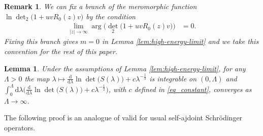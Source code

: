 \documentclass{article}
\def\d{\mathrm{d}}
\newtheorem{Remark}[Theorem]{Remark}
\newtheorem{Lemma}[Theorem]{Lemma}
\begin{document}
\begin{Remark}\label{rmk:branch}
We can fix a branch of the meromorphic function $\ln \det_2\big(1+uvR_0(z)v\big)$ by the condition
\begin{align*}
\lim_{|z| \to \infty} \arg\Big({\det}_2\big(1+uvR_0(z)v\big) \Big)&= 0.
\end{align*}
Fixing this branch gives $m = 0$ in Lemma \ref{lem:high-energy-limit} and we take this convention for the rest of this paper.
\end{Remark}

\begin{Lemma}\label{lem:integrable}
Under the assumptions of Lemma \ref{lem:high-energy-limit}, for any $\Lambda > 0$ the map $\lambda \mapsto \frac{\d}{\d \lambda} \ln\det\big(S(\lambda)\big) + c \lambda^{-\frac12}$ is integrable on $(0,\Lambda)$ and $\int_0^\Lambda \d\lambda \big(\frac{\d}{\d \lambda} \ln\det\big(S(\lambda)\big) + c \lambda^{-\frac12}\big)$, with $c$ defined in \eqref{eq_constant}, converges as $\Lambda\to\infty$.
\end{Lemma}

The following proof is an analogue of \cite[Lem.~4.12]{Angus} valid for usual self-ajdoint Schr\"{o}dinger operators.
\end{document}
